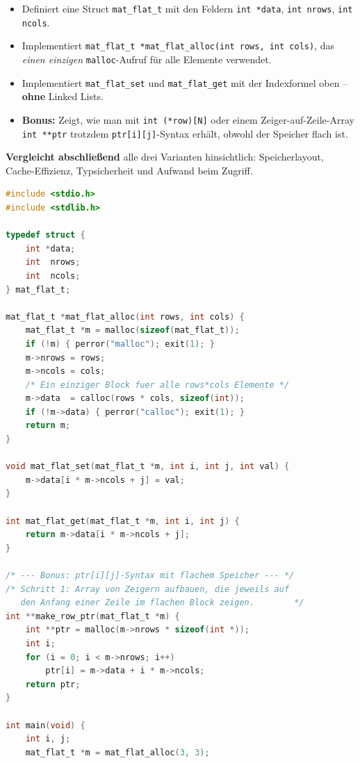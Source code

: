 \begin{enumerate}[a)]
\begin{itemize}
  \item Definiert eine Struct \texttt{mat\_flat\_t} mit den Feldern
        \texttt{int *data}, \texttt{int nrows}, \texttt{int ncols}.
  \item Implementiert \texttt{mat\_flat\_t *mat\_flat\_alloc(int rows, int cols)},
        das \emph{einen einzigen} \texttt{malloc}-Aufruf für alle Elemente verwendet.
  \item Implementiert \texttt{mat\_flat\_set} und \texttt{mat\_flat\_get}
        mit der Indexformel oben -- \textbf{ohne} Linked Lists.
  \item \textbf{Bonus:} Zeigt, wie man mit \texttt{int (*row)[N]} oder einem
        Zeiger-auf-Zeile-Array \texttt{int **ptr} trotzdem \texttt{ptr[i][j]}-Syntax
        erhält, obwohl der Speicher flach ist.
\end{itemize}

\textbf{Vergleicht abschließend} alle drei Varianten hinsichtlich:
Speicherlayout, Cache-Effizienz, Typsicherheit und Aufwand beim Zugriff.

\begin{loesung}
\begin{lstlisting}[language=C]
#include <stdio.h>
#include <stdlib.h>

typedef struct {
    int *data;
    int  nrows;
    int  ncols;
} mat_flat_t;

mat_flat_t *mat_flat_alloc(int rows, int cols) {
    mat_flat_t *m = malloc(sizeof(mat_flat_t));
    if (!m) { perror("malloc"); exit(1); }
    m->nrows = rows;
    m->ncols = cols;
    /* Ein einziger Block fuer alle rows*cols Elemente */
    m->data  = calloc(rows * cols, sizeof(int));
    if (!m->data) { perror("calloc"); exit(1); }
    return m;
}

void mat_flat_set(mat_flat_t *m, int i, int j, int val) {
    m->data[i * m->ncols + j] = val;
}

int mat_flat_get(mat_flat_t *m, int i, int j) {
    return m->data[i * m->ncols + j];
}

/* --- Bonus: ptr[i][j]-Syntax mit flachem Speicher --- */
/* Schritt 1: Array von Zeigern aufbauen, die jeweils auf
   den Anfang einer Zeile im flachen Block zeigen.        */
int **make_row_ptr(mat_flat_t *m) {
    int **ptr = malloc(m->nrows * sizeof(int *));
    int i;
    for (i = 0; i < m->nrows; i++)
        ptr[i] = m->data + i * m->ncols;
    return ptr;
}

int main(void) {
    int i, j;
    mat_flat_t *m = mat_flat_alloc(3, 3);


\end{lstlisting}
\end{loesung}
\end{enumerate}
